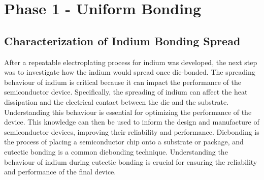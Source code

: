 \section{Phase 1 - Uniform Bonding}

\subsection{Characterization of Indium Bonding Spread}
After a repeatable electroplating process for indium was developed, the next step was to investigate how the indium would spread once die-bonded. The spreading behaviour of indium is critical because it can impact the performance of the semiconductor device. Specifically, the spreading of indium can affect the heat dissipation and the electrical contact between the die and the substrate. Understanding this behaviour is essential for optimizing the performance of the device.
This knowledge can then be used to inform the design and manufacture of semiconductor devices, improving their reliability and performance.
Diebonding is the process of placing a semiconductor chip onto a substrate or package, and eutectic bonding is a common diebonding technique. Understanding the behaviour of indium during eutectic bonding is crucial for ensuring the reliability and performance of the final device.

